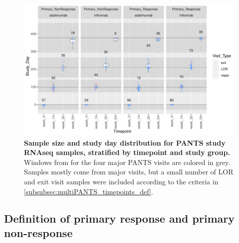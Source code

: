 \begin{figure}
    \centering
    \includegraphics[width=1.0\textwidth,page=1]{mainmatter/figures/chapter_04/process_pheno.pheno_filtered_dge.Study_Day_vs_Visit_Label.pdf}
    \caption[
    ]{
        \textbf{Sample size and study day distribution for \gls{PANTS} study \gls{RNAseq} samples, stratified by timepoint and study group.}
        Windows from \textcite{kennedy2019PredictorsAntiTNFTreatment} for the four major \gls{PANTS} visits are colored in grey. 
        Samples mostly come from major visits, but a small number of \gls{LOR} and exit visit samples were included according to the criteria in \cref{subsubsec:multiPANTS_timepoints_def}.
    }
    \label{fig:multipants_studyDay_boxplots}
\end{figure}

\subsection{Definition of primary response and primary non-response}
\label{multiPANTS:PR_definition}

